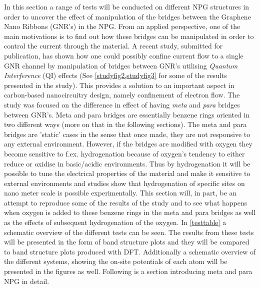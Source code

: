 In this section a range of tests will be conducted on different NPG structures in order to uncover the effect of manipulation of the bridges between the Graphene Nano Ribbons (GNR's) in the NPG. From an applied perspective, one of the main motivations is to find out how these bridges can be manipulated in order to control the current through the material. A recent study\cite{unpub}, submitted for publication, has shown how one could possibly confine current flow to a single GNR channel by manipulation of bridges between GNR's utilising \textit{Quantum Interference} (QI) effects (See \cref{studyfig2,studyfig3} for some of the results presented in the study). This provides a solution to an important aspect in carbon-based nanocircuitry design, namely confinement of electron flow. The study was focused on the difference in effect of having \textit{meta} and \textit{para} bridges between GNR's. Meta and para bridges are essentially benzene rings oriented in two different ways (more on that in the following sections). The meta and para bridges are 'static' cases in the sense that once made, they are not responsive to any external environment. However, if the bridges are modified with oxygen they become sensitive to f.ex. hydrogenation because of oxygen's tendency to either reduce or oxidise in basic/acidic environments. Thus by hydrogenation it will be possible to tune the electrical properties of the material and make it sensitive to external environments and studies\cite{fan_redox_2017} show that hydrogenation of specific sites on nano meter scale is possible experimentally. This section will, in part, be an attempt to reproduce some of the results of the study and to see what happens when oxygen is added to these benzene rings in the meta and para bridges as well as the effects of subsequent hydrogenation of the oxygen.  In \cref{testtable} a schematic overview of the different tests can be seen. The results from these tests will be presented in the form of band structure plots and they will be compared to band structure plots produced with DFT. Additionally a schematic overview of the different systems, showing the on-site potentials of each atom will be presented in the figures as well. Following is a section introducing meta and para NPG in detail.
